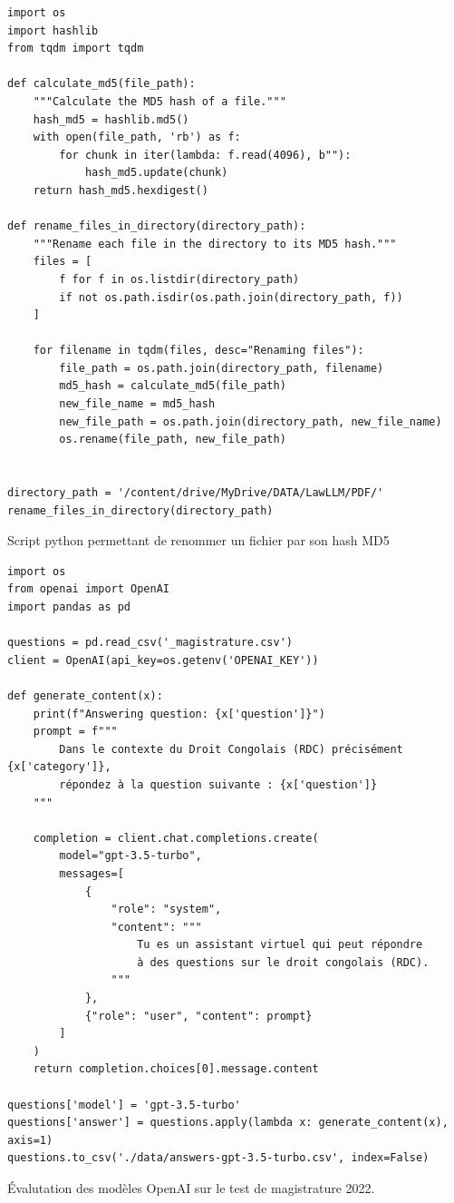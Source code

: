 \begin{listing}[!ht]
\begin{verbatim}
import os
import hashlib
from tqdm import tqdm

def calculate_md5(file_path):
    """Calculate the MD5 hash of a file."""
    hash_md5 = hashlib.md5()
    with open(file_path, 'rb') as f:
        for chunk in iter(lambda: f.read(4096), b""):
            hash_md5.update(chunk)
    return hash_md5.hexdigest()

def rename_files_in_directory(directory_path):
    """Rename each file in the directory to its MD5 hash."""
    files = [
        f for f in os.listdir(directory_path) 
        if not os.path.isdir(os.path.join(directory_path, f))
    ]
    
    for filename in tqdm(files, desc="Renaming files"):
        file_path = os.path.join(directory_path, filename)
        md5_hash = calculate_md5(file_path)
        new_file_name = md5_hash
        new_file_path = os.path.join(directory_path, new_file_name)
        os.rename(file_path, new_file_path)


directory_path = '/content/drive/MyDrive/DATA/LawLLM/PDF/'
rename_files_in_directory(directory_path)
\end{verbatim}
\caption{Script python permettant de renommer un fichier par son hash MD5}
\label{appendix:code:python:md5-filename-hashing}
\end{listing}

\begin{listing}[!ht]
\begin{verbatim}
import os
from openai import OpenAI
import pandas as pd

questions = pd.read_csv('_magistrature.csv')
client = OpenAI(api_key=os.getenv('OPENAI_KEY'))

def generate_content(x):
    print(f"Answering question: {x['question']}")
    prompt = f"""
        Dans le contexte du Droit Congolais (RDC) précisément {x['category']},
        répondez à la question suivante : {x['question']}
    """

    completion = client.chat.completions.create(
        model="gpt-3.5-turbo",
        messages=[
            {
                "role": "system",
                "content": """
                    Tu es un assistant virtuel qui peut répondre 
                    à des questions sur le droit congolais (RDC).
                """
            },
            {"role": "user", "content": prompt}
        ]
    )
    return completion.choices[0].message.content

questions['model'] = 'gpt-3.5-turbo'
questions['answer'] = questions.apply(lambda x: generate_content(x), axis=1)
questions.to_csv('./data/answers-gpt-3.5-turbo.csv', index=False)
\end{verbatim}
\caption{Évalutation des modèles OpenAI sur le test de magistrature 2022.}
\label{appendix:code:python:gpt-3-evaluation}
\end{listing}

